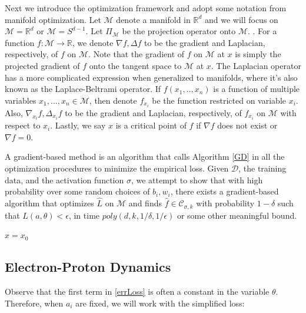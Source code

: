 \documentclass[11pt]{article}
\newcommand{\N}{{\mathbb{N}}}
\newcommand{\R}{{\mathbb{R}}}
\begin{document}
Next we introduce the optimization framework and adopt some notation from manifold optimization. Let $\mathcal{M}$ denote a manifold in $\R^d$ and we will focus on $\mathcal{M}= \R^d$ or $\mathcal{M} =  S^{d-1}$. Let $\Pi_{\mathcal{M}}$ be the projection operator onto $\mathcal{M}$. . For a function $f: \mathcal{M} \to \R$, we denote $\nabla f, \Delta f$ to be the gradient and Laplacian, respectively, of $f$ on $\mathcal{M}$. Note that the gradient of $f$ on $\mathcal{M}$ at $x$ is simply the projected gradient of $f$ onto the tangent space to $\mathcal{M}$ at $x$. The Laplacian operator has a more complicated expression when generalized to manifolds, where it's also known as the Laplace-Beltrami operator. If $f(x_1,..,x_n)$ is a function of multiple variables $x_1,...,x_n \in \mathcal{M}$, then denote $f_{x_i}$ be the function restricted on variable $x_i$. Also, $\nabla_{x_i}f, \Delta_{x_i}f$ to be the gradient and Laplacian, respectively, of $f_{x_i}$ on $\mathcal{M}$ with respect to $x_i$. Lastly, we say $x$ is a critical point of $f$ if $\nabla f$ does not exist or $\nabla f = 0$.

A gradient-based method is an algorithm that calls Algorithm \ref{GD} in all the optimization procedures to minimize the empirical loss. Given $\mathcal{D}$, the training data, and the activation function $\sigma$, we attempt to show that with high probability over some random choices of $b_i, w_i$, there exists a gradient-based algorithm that optimizes $\widehat{L}$ on $\mathcal{M}$ and finds $\widehat{f} \in \mathcal{C}_{\sigma, k}$ with probability $1-\delta$ such that $L(a,\theta) <\epsilon$, in time $poly(d,k,1/\delta,1/\epsilon)$ or some other meaningful bound.



\begin{algorithm}[h]
\SetAlgoLined
\KwIn{$L: \mathcal{M} \to \R$; $x_0 \in \mathcal{M}$; $T\in \N$; $\alpha\in \R$}
 $x = x_0$\;
 \caption{$x = GradientDescent(L,x_0, T,\alpha$)}
 \label{GD}
\end{algorithm}


\subsection{Electron-Proton Dynamics}

Observe that the first term in \eqref{errLoss} is often a constant in the variable $\theta$. Therefore, when $a_i$ are fixed, we will work with the simplified loss:
\end{document}

